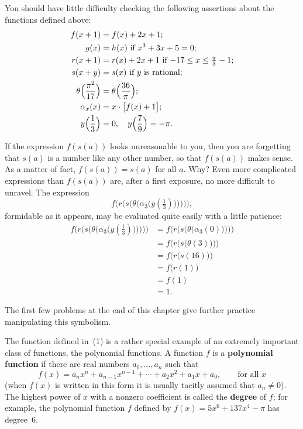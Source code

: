 You should have little difficulty checking the following assertions about the
functions defined above:
\begin{align*}
f(x+1) &= f(x) + 2x + 1;\\
g(x) &= h(x)\text{ if }x^3 + 3x + 5 = 0;\\
r(x+1) &= r(x) + 2x + 1\text{ if }{-17} \leq x \leq \tfrac{\pi}{3} - 1;\\
s(x+y) &= s(x)\text{ if $y$ is rational;}\\
\theta\Bigl(\frac{\pi^2}{17}\Bigr) &= \theta\Bigl(\frac{36}{\pi}\Bigr);\\
\alpha_x(x) &= x \cdot \bigl[f(x) + 1\bigr];\\
y\Bigl(\frac{1}{3}\Bigr) &= 0,\quad
y\Bigl(\frac{7}{9}\Bigr) = -\pi.
\end{align*}

If the expression $f(s(a))$ looks unreasonable to you, then you are forgetting
that $s(a)$ is a number like any other number, so that $f(s(a))$ makes sense.
As a matter of fact, $f(s(a)) = s(a)$ for all $a$. Why? Even more complicated
expressions than $f(s(a))$ are, after a first exposure, no more difficult to
unravel. The expression
\[
f\bigl(r\bigl(s\bigl(\theta\bigl(\alpha_3\bigl(y(\tfrac13)\bigr)\bigr)\bigr)\bigr)\bigr),
\]
formidable as it appears, may be evaluated quite easily with a little patience:
\begin{align*}
f\bigl(r\bigl(s\bigl(\theta\bigl(\alpha_3\bigl(y(\tfrac13)\bigr)\bigr)\bigr)\bigr)\bigr)
&= f\bigl(r\bigl(s\bigl(\theta\bigl(\alpha_3(0)\bigr)\bigr)\bigr)\bigr)\\
&= f\bigl(r\bigl(s\bigl(\theta(3)\bigr)\bigr)\bigr)\\
&= f\bigl(r\bigl(s(16)\bigr)\bigr)\\
&= f\bigl(r(1)\bigr)\\
&= f(1)\\
&= 1.
\end{align*}

The first few problems at the end of this chapter give further practice
manipulating this symbolism.

The function defined in~(1) is a rather special example of an extremely
important class of functions, the polynomial functions. A function $f$ is a
\textbf{polynomial function} if there are real numbers $a_0, \dots, a_n$ such
that
\[
f(x) = a_n x^n + a_{n-1}x^{n-1} + \cdots + a_2 x^2 + a_1 x + a_0,
\qquad\text{for all $x$}
\]
(when $f(x)$ is written in this form it is usually tacitly assumed that
$a_n \neq 0$). The highest power of $x$ with a nonzero coefficient is called
the \textbf{degree} of $f$; for example, the polynomial function $f$ defined by
$f(x) = 5x^6 + 137x^4 - \pi$ has degree~$6$.

